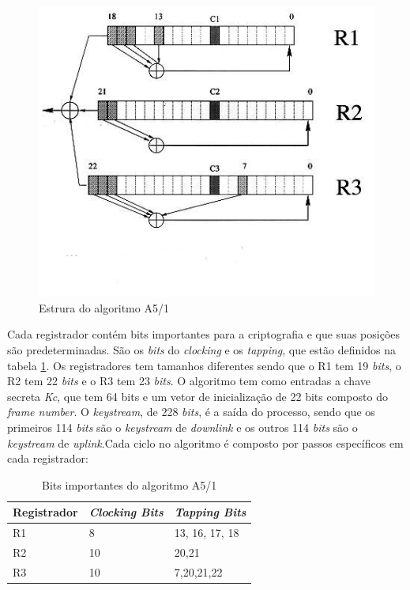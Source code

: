 \begin{figure}[h]
\centering
\includegraphics[keepaspectratio=true,scale=0.7]
    {figuras/a5_1.eps}
    \caption[Estrura do algoritmo A5/1]{Estrura do algoritmo A5/1\protect\footnotemark} 
\end{figure}

Cada registrador contém bits importantes para a criptografia e que suas posições são predeterminadas. São os \textit{bits} do \textit{clocking} e os \textit{tapping}, que estão definidos na tabela \ref{important-bits}. Os registradores tem tamanhos diferentes sendo que o R1 tem 19 \textit{bits}, o R2 tem 22 \textit{bits} e o R3 tem 23 \textit{bits}. O algoritmo tem como entradas a chave secreta \textit{Kc}, que tem 64 bits e um vetor de inicialização de 22 bits composto do \textit{frame number}. O \textit{keystream}, de 228 \textit{bits}, é a saída do processo, sendo que os primeiros 114 \textit{bits} são o \textit{keystream} de \textit{downlink} e os outros 114 \textit{bits} são o \textit{keystream} de \textit{uplink}.Cada ciclo no algoritmo é composto por passos específicos em cada registrador:

\begin{table}[h]
\centering
	\begin{tabular}{|l|l|l|}
		\hline
		Registrador & \textit{Clocking Bits} & \textit{Tapping Bits} \\ \hline
		R1 & 8 & 13, 16, 17, 18 \\ \hline
		R2 & 10 & 20,21 \\ \hline
		R3 & 10 & 7,20,21,22 \\ \hline	
	\end{tabular}
	\caption{Bits importantes do algoritmo A5/1}
	\label{important-bits}
\end{table}

